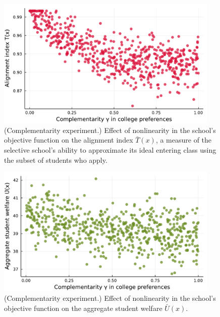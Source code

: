 \documentclass[12pt]{article} %
\theoremstyle{definition}
\theoremstyle{definition}
\begin{document}
\begin{figure}[h!]
  \begin{center}\includegraphics[width=0.95\textwidth]{./TwoSchoolModels/CombiPref-complementarity/complementarity-T.pdf}\end{center}
  \caption{(Complementarity experiment.) Effect of nonlinearity in the school's objective function on the alignment index $\bar T(x)$, a measure of the selective school's ability to approximate its ideal entering class using the subset of students who apply.}
\end{figure}

\begin{figure}[h!]
  \begin{center}\includegraphics[width=0.95\textwidth]{./TwoSchoolModels/CombiPref-complementarity/complementarity-U.pdf}\end{center}
  \caption{(Complementarity experiment.) Effect of nonlinearity in the school's objective function on the aggregate student welfare $\bar U(x)$. }
\end{figure}
\end{document}
